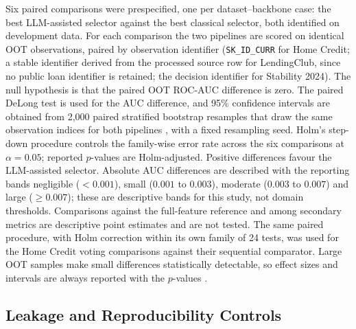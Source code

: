 \documentclass[preprint,12pt]{elsarticle}
\begin{document}
Six paired comparisons were prespecified, one per dataset--backbone case: the best LLM-assisted selector against the best classical selector, both identified on development data. For each comparison the two pipelines are scored on identical OOT observations, paired by observation identifier (\texttt{SK\_ID\_CURR} for Home Credit; a stable identifier derived from the processed source row for LendingClub, since no public loan identifier is retained; the decision identifier for Stability 2024). The null hypothesis is that the paired OOT ROC-AUC difference is zero. The paired DeLong test \cite{delong1988} is used for the AUC difference, and 95\% confidence intervals are obtained from 2,000 paired stratified bootstrap resamples that draw the same observation indices for both pipelines \cite{efron1993}, with a fixed resampling seed. Holm's step-down procedure \cite{holm1979} controls the family-wise error rate across the six comparisons at $\alpha=0.05$; reported $p$-values are Holm-adjusted. Positive differences favour the LLM-assisted selector. Absolute AUC differences are described with the reporting bands negligible ($<0.001$), small ($0.001$ to $0.003$), moderate ($0.003$ to $0.007$) and large ($\ge0.007$); these are descriptive bands for this study, not domain thresholds. Comparisons against the full-feature reference and among secondary metrics are descriptive point estimates and are not tested. The same paired procedure, with Holm correction within its own family of 24 tests, was used for the Home Credit voting comparisons against their sequential comparator. Large OOT samples make small differences statistically detectable, so effect sizes and intervals are always reported with the $p$-values \cite{demsar2006}.

\subsection{Leakage and Reproducibility Controls}
\label{subsec:leakage_controls}
\end{document}
